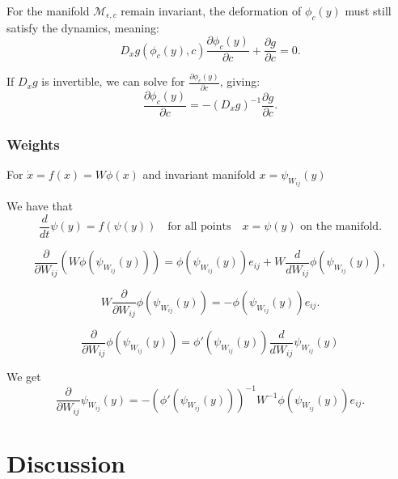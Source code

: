 \documentclass{article}
\theoremstyle{definition} \newtheorem{definition}{Definition}
\theoremstyle{remark} \newtheorem{remark}{Remark}
\newcommand{\manifold}{\mathcal{M}}
\newcounter{ct}
\begin{document}
For the manifold $\manifold_{\epsilon,c}$ remain invariant, the deformation of $\phi_c(y)$ must still satisfy the dynamics, meaning:
\begin{equation}
D_x g(\phi_c(y), c) \frac{\partial \phi_c(y)}{\partial c} + \frac{\partial g}{\partial c} = 0.
\end{equation}

If $D_x g$ is invertible, we can solve for $\frac{\partial \phi_c(y)}{\partial c}$, giving:
\begin{equation}
\frac{\partial \phi_c(y)}{\partial c} = - (D_x g)^{-1} \frac{\partial g}{\partial c}.
\end{equation}


\subsubsection{Weights}
For $\dot x= f(x) =W\phi(x)$ and invariant manifold $x=\psi_{W_{ij}}(y)$

We have that 
\begin{equation}
\frac{d}{dt} \psi(y) =f(\psi(y)) \quad \text{for all points} \quad x = \psi(y) \text{ on the manifold}.
\end{equation}

\begin{equation}
\frac{\partial}{\partial W_{ij}} \left( W \phi(\psi_{W_{ij}}(y)) \right) = \phi(\psi_{W_{ij}}(y)) e_{ij} + W \frac{d}{dW_{ij}} \phi(\psi_{W_{ij}}(y)),
\end{equation}

\begin{equation}
W \frac{\partial}{\partial W_{ij}}  \phi(\psi_{W_{ij}}(y)) = - \phi(\psi_{W_{ij}}(y)) e_{ij}.
\end{equation}


\begin{equation}
\frac{\partial}{\partial W_{ij}}  \phi(\psi_{W_{ij}}(y)) = \phi'(\psi_{W_{ij}}(y))\frac{d}{dW_{ij}}\psi_{W_{ij}}(y)
\end{equation}

We get 
\begin{equation}
\frac{\partial}{\partial W_{ij}} \psi_{W_{ij}}(y) = - \left(\phi'(\psi_{W_{ij}}(y))\right)^{-1} W^{-1} \phi(\psi_{W_{ij}}(y)) e_{ij}.
\end{equation}



\section{Discussion}
\end{document}

